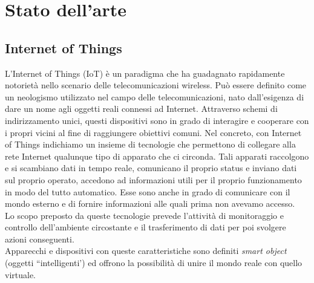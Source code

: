 \chapter{Stato dell'arte}
\label{ch:stato_arte}

\section{Internet of Things}
L'Internet of Things (IoT) \cite{atzori2010internet} è un paradigma che ha guadagnato rapidamente notorietà nello scenario delle telecomunicazioni wireless. Può essere definito come un neologismo utilizzato nel campo delle telecomunicazioni, nato dall'esigenza di dare un nome agli oggetti reali connessi ad Internet. Attraverso schemi di indirizzamento unici, questi dispositivi sono in grado di interagire e cooperare con i propri vicini al fine di raggiungere obiettivi comuni.
Nel concreto, con Internet of Things \cite{li2015internet, rose2015internet} indichiamo un insieme di tecnologie che permettono di collegare alla rete Internet qualunque tipo di apparato che ci circonda. Tali apparati raccolgono e si scambiano dati in tempo reale, comunicano il proprio status e inviano dati sul proprio operato, accedono ad informazioni utili per il proprio funzionamento in modo del tutto automatico. Esse sono anche in grado di comunicare con il mondo esterno e di fornire informazioni alle quali prima non avevamo accesso. \\
Lo scopo preposto da queste tecnologie prevede l'attività di monitoraggio e controllo dell'ambiente circostante e il trasferimento di dati per poi svolgere azioni conseguenti.\\
Apparecchi e dispositivi con queste caratteristiche sono definiti \textit{smart object} (oggetti ``intelligenti') ed offrono la possibilità di unire il mondo reale con quello virtuale.\\

